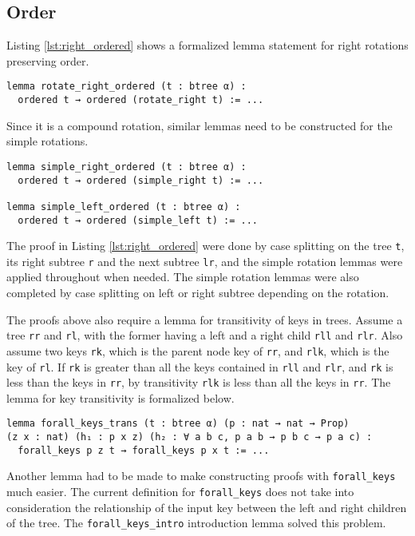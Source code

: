 \subsection*{Order}
Listing \ref{lst:right_ordered} shows a formalized lemma statement for right rotations preserving order.

\begin{lstlisting}[caption=\empty, label={lst:right_ordered}]
lemma rotate_right_ordered (t : btree α) :
  ordered t → ordered (rotate_right t) := ...
\end{lstlisting}

Since it is a compound rotation, similar lemmas need to be constructed for the simple rotations.

\begin{lstlisting}[caption=\empty, label={lst:simple_ordered}]
lemma simple_right_ordered (t : btree α) :
  ordered t → ordered (simple_right t) := ...

lemma simple_left_ordered (t : btree α) :
  ordered t → ordered (simple_left t) := ...
\end{lstlisting}

The proof in Listing \ref{lst:right_ordered} were done by case splitting on the tree \lstinline{t}, its right subtree \lstinline{r} and the next subtree \lstinline{lr}, and the simple rotation lemmas were applied throughout when needed. The simple rotation lemmas were also completed by case splitting on left or right subtree depending on the rotation.

The proofs above also require a lemma for transitivity of keys in trees. Assume a tree \lstinline{rr} and \lstinline{rl}, with the former having a left and a right child \lstinline{rll} and \lstinline{rlr}. Also assume two keys \lstinline{rk}, which is the parent node key of \lstinline{rr}, and \lstinline{rlk}, which is the key of \lstinline{rl}.
If \lstinline{rk} is greater than all the keys contained in \lstinline{rll} and \lstinline{rlr}, and \lstinline{rk} is less than the keys in \lstinline{rr}, by transitivity \lstinline{rlk} is less than all the keys in \lstinline{rr}. The lemma for key transitivity is formalized below.

\begin{lstlisting}[caption=\empty]
lemma forall_keys_trans (t : btree α) (p : nat → nat → Prop) 
(z x : nat) (h₁ : p x z) (h₂ : ∀ a b c, p a b → p b c → p a c) :
  forall_keys p z t → forall_keys p x t := ...
\end{lstlisting}

Another lemma had to be made to make constructing proofs with \lstinline{forall_keys} much easier. The current definition for \lstinline{forall_keys} does not take into consideration the relationship of the input key between the left and right children of the tree. The \lstinline{forall_keys_intro} introduction lemma solved this problem.

